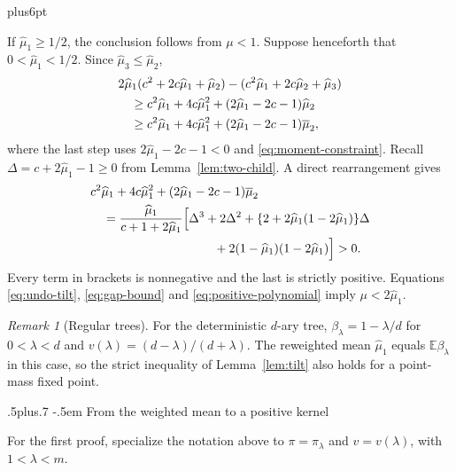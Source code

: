 \documentclass[11pt,reqno]{amsart}
\makeatletter
\def\subsection{\@startsection{subsection}{2}{0pt}%
  {.5\linespacing plus.7\linespacing}
  {-.5em}
  {\normalfont\scshape}}
\theoremstyle{plain}
\theoremstyle{definition}
\theoremstyle{remark}
\newtheorem{remark}[theorem]{Remark}
\renewenvironment{proof}[1][\proofname]{%
  \par
  \pushQED{\qed}%
  \normalfont
  \topsep6pt plus6pt\relax
  \trivlist
  \item[\hskip\labelsep\slshape #1\@addpunct{.}]%
  \ignorespaces
}{%
  \popQED
  \endtrivlist
  \@endpefalse
}
\DeclareRobustCommand{\qed}{%
  \leavevmode\unskip\penalty9999\hbox{}\nobreak
  \ifmmode
    \makebox[0pt][l]{\qquad\hbox{\qedsymbol}}%
  \else
    \qquad\hbox{\qedsymbol}%
  \fi
}
\renewcommand{\qedsymbol}{\rule[.47pt]{4pt}{6pt}}
\numberwithin{equation}{section}
\newcommand{\E}{\mathbb E}
\makeatother
\begin{document}
\begin{proof}
If $\widehat\mu_1\ge1/2$, the conclusion follows from $\mu<1$. Suppose henceforth that
$0<\widehat\mu_1<1/2$. Since $\widehat\mu_3\le \widehat\mu_2$,
\begin{align}
 &2\widehat\mu_1(c^2+2c\widehat\mu_1+\widehat\mu_2)
   -(c^2\widehat\mu_1+2c\widehat\mu_2+\widehat\mu_3)\notag\\
 &\hspace{1em}\ge c^2\widehat\mu_1+4c\widehat\mu_1^2
                  +(2\widehat\mu_1-2c-1)\widehat\mu_2\notag\\
 &\hspace{1em}\ge c^2\widehat\mu_1+4c\widehat\mu_1^2
                  +(2\widehat\mu_1-2c-1)\overline\mu_2,
 \label{eq:gap-bound}
\end{align}
where the last step uses $2\widehat\mu_1-2c-1<0$ and \eqref{eq:moment-constraint}.
Recall $\Delta=c+2\widehat\mu_1-1\ge0$ from Lemma~\ref{lem:two-child}. A direct rearrangement gives
\begin{align}
 &c^2\widehat\mu_1+4c\widehat\mu_1^2
       +(2\widehat\mu_1-2c-1)\overline\mu_2\notag\\
 &\quad=\frac{\widehat\mu_1}{c+1+2\widehat\mu_1}\Bigl[
 \Delta^3+2\Delta^2+\{2+2\widehat\mu_1(1-2\widehat\mu_1)\}\Delta\notag\\
 &\hspace{10em}+2(1-\widehat\mu_1)(1-2\widehat\mu_1)\Bigr]>0.
 \label{eq:positive-polynomial}
\end{align}
Every term in brackets is nonnegative and the last is strictly positive.
Equations \eqref{eq:undo-tilt}, \eqref{eq:gap-bound} and
\eqref{eq:positive-polynomial} imply $\mu<2\widehat\mu_1$.
\end{proof}

\begin{remark}[Regular trees]\label{rem:regular}
For the deterministic $d$-ary tree, $\beta_\lambda=1-\lambda/d$ for
$0<\lambda<d$ and
$v(\lambda)=(d-\lambda)/(d+\lambda)$. The reweighted mean $\widehat\mu_1$ equals
$\E\beta_\lambda$ in this case, so the strict inequality of
Lemma~\ref{lem:tilt} also holds for a point-mass fixed point.
\end{remark}

\subsection{From the weighted mean to a positive kernel}\label{sec:kernel}

For the first proof, specialize the notation above to
$\pi=\pi_\lambda$ and $v=v(\lambda)$, with $1<\lambda<m$.
\end{document}
